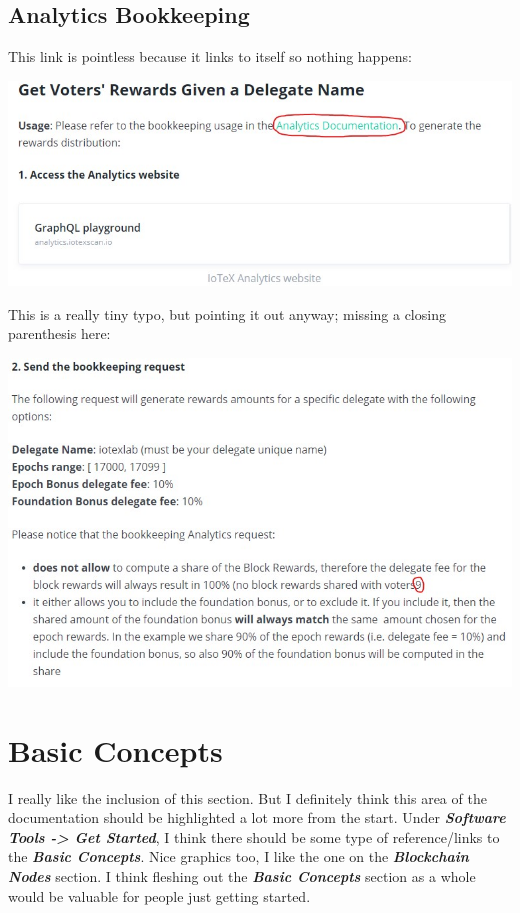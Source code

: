 \documentclass[
]{book}
\begin{document}
\hypertarget{analytics-bookkeeping}{%
\section{Analytics Bookkeeping}\label{analytics-bookkeeping}}

This link is pointless because it links to itself so nothing happens:

\includegraphics{images/analytics_documentation.jpg}

This is a really tiny typo, but pointing it out anyway; missing a
closing parenthesis here:

\includegraphics{images/missing_parentheses.jpg}

\hypertarget{basic-concepts}{%
\chapter{Basic Concepts}\label{basic-concepts}}

I really like the inclusion of this section. But I definitely think this
area of the documentation should be highlighted a lot more from the
start. Under \textbf{\emph{Software Tools -\textgreater{} Get Started}},
I think there should be some type of reference/links to the
\textbf{\emph{Basic Concepts}}. Nice graphics too, I like the one on the
\textbf{\emph{Blockchain Nodes}} section. I think fleshing out the
\textbf{\emph{Basic Concepts}} section as a whole would be valuable for
people just getting started.
\end{document}
